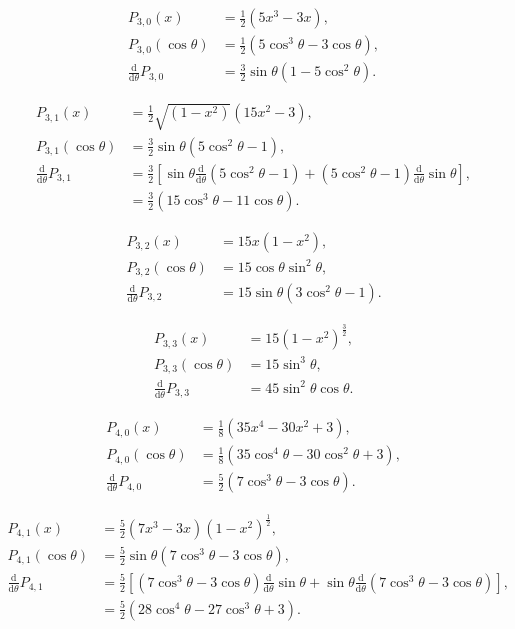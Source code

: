 \documentclass[]{article}
\begin{document}
	\begin{align}
		P_{3,0} (x) &= \frac{1}{2} (5x^3 - 3x), \\
		P_{3,0} (\cos{\theta}) &= \frac{1}{2} (5 \cos^3{\theta} - 3\cos{\theta}), \\
		\frac{\text{d}}{\text{d} \theta} P_{3,0} &= \frac{3}{2} \sin{\theta} (1 - 5 \cos^2{\theta}).
	\end{align}


	\begin{align}
		P_{3,1} (x) &= \frac{1}{2} \sqrt{(1-x^2)}(15x^2 - 3), \\
		P_{3,1} (\cos{\theta}) &= \frac{3}{2} \sin{\theta}(5\cos^2{\theta} -1), \\
		\frac{\text{d}}{\text{d} \theta} P_{3,1} &= \frac{3}{2} \left[\sin{\theta}\frac{\text{d}}{\text{d}\theta}(5\cos^2{\theta}-1) + (5\cos^2{\theta} - 1)\frac{\text{d}}{\text{d}\theta}\sin{\theta}\right], \\
		&= \frac{3}{2} (15\cos^3{\theta} - 11\cos{\theta}).
	\end{align}

	\begin{align}
		P_{3,2} (x) &= 15x (1-x^2), \\
		P_{3,2} (\cos{\theta}) &= 15 \cos{\theta} \sin^2{\theta}, \\
		\frac{\text{d}}{\text{d} \theta} P_{3,2} &= 15 \sin{\theta} (3\cos^2{\theta} - 1).
	\end{align}

	\begin{align}
		P_{3,3} (x) &= 15(1-x^2)^\frac{3}{2}, \\
		P_{3,3} (\cos{\theta}) &= 15 \sin^3{\theta}, \\
		\frac{\text{d}}{\text{d} \theta} P_{3,3} &= 45 \sin^2{\theta}\cos{\theta}.
	\end{align}

	\begin{align}
		P_{4,0} (x) &= \frac{1}{8}(35x^4 - 30x^2 + 3), \\
		P_{4,0} (\cos{\theta}) &= \frac{1}{8}(35 \cos^4{\theta} - 30\cos^2{\theta} + 3), \\
		\frac{\text{d}}{\text{d} \theta} P_{4,0} &= \frac{5}{2}(7\cos^3{\theta} - 3\cos{\theta}).
	\end{align}


	\begin{align}
		P_{4,1} (x) &= \frac{5}{2}(7x^3 - 3x) (1-x^2)^\frac{1}{2}, \\
		P_{4,1} (\cos{\theta}) &= \frac{5}{2} \sin{\theta}(7\cos^3{\theta} - 3\cos{\theta}), \\
		\frac{\text{d}}{\text{d} \theta} P_{4,1} &= \frac{5}{2}\left[(7\cos^3{\theta} - 3\cos{\theta})\frac{\text{d}}{\text{d}\theta}\sin{\theta} + \sin{\theta} \frac{\text{d}}{\text{d}\theta}(7\cos^3{\theta} - 3\cos{\theta})\right], \\
		&= \frac{5}{2}(28 \cos^4{\theta} - 27 \cos^3{\theta} + 3).
	\end{align}
	
\end{document}
